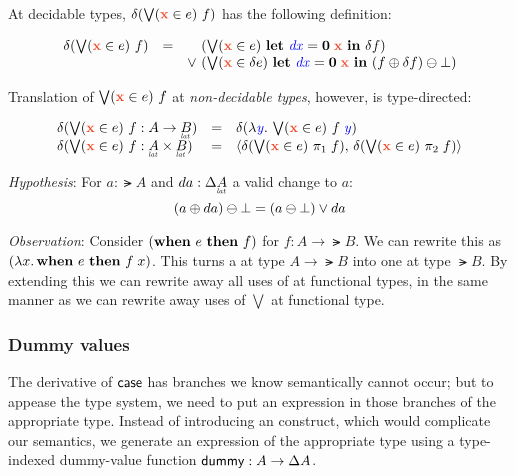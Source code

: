 \documentclass{article}
\newcommand{\dummy}{\ms{dummy}}
\begin{document}
At decidable types, $\delta(\setelim{\d{x}}{e}{f})$ has the following definition:

\[\begin{array}{rcl}
  \delta(\setelim{\d{x}}{e}{f})
  &=& \phantom{\vee~} (\setelim{\d{x}}{e}{\letv{\m{dx}}{\zero\; \d{x}} \delta f})
  \\ && \vee~ (\setelim{\d{x}}{\delta e}{\letv{\m{dx}}{\zero\; \d{x}}
    (f \oplus \delta f) \ominus \unit})
\end{array}\]


Translation of $\setelim{\d{x}}{e}{f}$ at \emph{non-decidable types}, however,
is type-directed:

\[\begin{array}{lcll}
  \delta(\setelim{\d{x}}{e}{f} : A \to \lat{B})
  &=& \delta(\fn\bind{\m y} \setelim{\d{x}}{e}{f\; \m y})\\
  \delta(\setelim{\d{x}}{e}{f} : \lat{A} \x \lat{B})
  &=& \pair{\delta(\setelim{\d{x}}{e}{\pi_1\; f})}
  {\delta(\setelim{\d{x}}{e}{\pi_2\; f})}
\end{array}\]

\emph{Hypothesis}: For $a : \lat{A}$ and $da : \Ch\lat{A}$ a valid change to
$a$:
\begin{equation*}
  (a \oplus da) \ominus \bot = (a \ominus \bot)
  \vee da
\end{equation*}

\emph{Observation}: Consider $(\mathbf{when}~{e}~\mathbf{then}~{f})$ for $f : A \to \lat{B}$. We can
rewrite this as $(\lambda{x}.\, \mathbf{when}~{e}~\mathbf{then}~{f\; x})$. This turns a  at type
$A \to \lat{B}$ into one at type $\lat{B}$. By extending this we can rewrite
away all uses of  at functional types, in the same manner as we can
rewrite away uses of $\bigvee$ at functional type.



\subsubsection{Dummy values}

The derivative of $\mathsf{case}$ has branches we know semantically cannot occur;
but to appease the type system, we need to put an expression in those branches
of the appropriate type. Instead of introducing an  construct, which
would complicate our semantics, we generate an expression of the appropriate
type using a type-indexed dummy-value function $\dummy{} : A \to \Ch{A}$.
\end{document}
